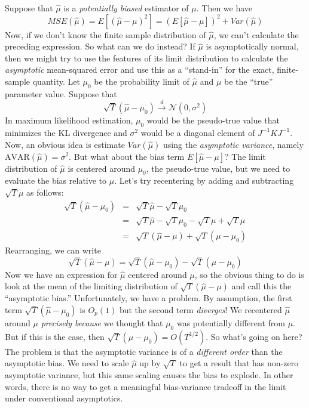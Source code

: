 Suppose that $\widehat{\mu}$ is a \emph{potentially biased} estimator of $\mu$. 
Then we have
$$MSE(\widehat{\mu}) = E[(\widehat{\mu} - \mu)^2] = \left(E[\widehat{\mu} - \mu]\right)^2 + Var(\widehat{\mu})$$
Now, if we don't know the finite sample distribution of $\widehat{\mu}$, we can't calculate the preceding expression. 
So what can we do instead? If $\widehat{\mu}$ is asymptotically normal, then we might try to use the features of its limit distribution to calculate the \emph{asymptotic} mean-squared error and use this as a ``stand-in'' for the exact, finite-sample quantity. 
Let $\mu_0$ be the probability limit of $\widehat{\mu}$ and $\mu$ be the ``true'' parameter value.
Suppose that
$$\sqrt{T}\left(\widehat{\mu} - \mu_0 \right) \overset{d}{\rightarrow} \mathcal{N}(0,\sigma^2)$$
In maximum likelihood estimation, $\mu_0$ would be the pseudo-true value that minimizes the KL divergence and $\sigma^2$ would be a diagonal element of $J^{-1}KJ^{-1}$. 
Now, an obvious idea is estimate $Var(\widehat{\mu})$ using the \emph{asymptotic variance}, namely $\mbox{AVAR}(\widehat{\mu}) = \sigma^2$. 
But what about the bias term $E[\widehat{\mu} - \mu]$? 
The limit distribution of $\widehat{\mu}$ is centered around $\mu_0$, the pseudo-true value, but we need to evaluate the bias relative to $\mu$.
Let's try recentering by adding and subtracting $\sqrt{T}\mu$ as follows:
\begin{eqnarray*}
\sqrt{T}\left(\widehat{\mu} - \mu_0 \right) &=& \sqrt{T}\widehat{\mu} - \sqrt{T} \mu_0\\
&=& \sqrt{T}\widehat{\mu} - \sqrt{T} \mu_0 - \sqrt{T} \mu + \sqrt{T} \mu\\
&=& \sqrt{T}\left( \widehat{\mu} - \mu\right) + \sqrt{T}\left(\mu - \mu_0 \right)
\end{eqnarray*}
Rearranging, we can write
$$\sqrt{T}\left( \widehat{\mu} - \mu\right) = \sqrt{T}\left(\widehat{\mu} - \mu_0 \right) - \sqrt{T}\left(\mu - \mu_0 \right)$$
Now we have an expression for $\widehat{\mu}$ centered around $\mu$, so the obvious thing to do is look at the mean of the limiting distribution of $\sqrt{T}\left( \widehat{\mu} - \mu\right) $ and call this the ``asymptotic bias.'' 
Unfortunately, we have a problem. By assumption, the first term $\sqrt{T}\left(\widehat{\mu} - \mu_0 \right)$ is $O_p(1)$ but the second term \emph{diverges}! 
We recentered $\widehat{\mu}$ around $\mu$ \emph{precisely because} we thought that $\mu_0$ was potentially different from $\mu$. But if this is the case, then $ \sqrt{T}\left(\mu - \mu_0 \right) = O(T^{1/2})$. 
So what's going on here? The problem is that the asymptotic variance is of a \emph{different order} than the asymptotic bias. 
We need to scale $\widehat{\mu}$ up by $\sqrt{T}$ to get a result that has non-zero asymptotic variance, but this same scaling causes the bias to explode. 
In other words, there is no way to get a meaningful bias-variance tradeoff in the limit under conventional asymptotics.

